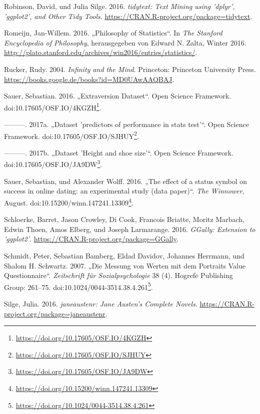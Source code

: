 \documentclass[12pt,ngerman,]{book}
\let\rmarkdownfootnote\footnote%
\def\footnote{\protect\rmarkdownfootnote}
\renewcommand{\href}[2]{#2\footnote{\url{#1}}}
\theoremstyle{definition}
\theoremstyle{definition}
\theoremstyle{remark}
\begin{document}
\hypertarget{ref-R-tidytext}{}
Robinson, David, und Julia Silge. 2016. \emph{tidytext: Text Mining
using 'dplyr', 'ggplot2', and Other Tidy Tools}.
\url{https://CRAN.R-project.org/package=tidytext}.

\hypertarget{ref-sep-statistics}{}
Romeijn, Jan-Willem. 2016. „Philosophy of Statistics``. In \emph{The
Stanford Encyclopedia of Philosophy}, herausgegeben von Edward N. Zalta,
Winter 2016.
\url{http://plato.stanford.edu/archives/win2016/entries/statistics/}.

\hypertarget{ref-ruckerinfinity}{}
Rucker, Rudy. 2004. \emph{Infinity and the Mind}. Princeton: Princeton
University Press. \url{https://books.google.de/books?id=MD0UAwAAQBAJ}.

\hypertarget{ref-Sauer_2016}{}
Sauer, Sebastian. 2016. „Extraversion Dataset``. Open Science Framework.
doi:\href{https://doi.org/10.17605/OSF.IO/4KGZH}{10.17605/OSF.IO/4KGZH}.

\hypertarget{ref-Sauer_2017}{}
---------. 2017a. „Dataset 'predictors of performance in stats test'``.
Open Science Framework.
doi:\href{https://doi.org/10.17605/OSF.IO/SJHUY}{10.17605/OSF.IO/SJHUY}.

\hypertarget{ref-Sauer_2017a}{}
---------. 2017b. „Dataset 'Height and shoe size'``. Open Science
Framework.
doi:\href{https://doi.org/10.17605/OSF.IO/JA9DW}{10.17605/OSF.IO/JA9DW}.

\hypertarget{ref-sauer_wolff}{}
Sauer, Sebastian, und Alexander Wolff. 2016. „The effect of a status
symbol on success in online dating: an experimental study (data
paper)``. \emph{The Winnower}, August.
doi:\href{https://doi.org/10.15200/winn.147241.13309}{10.15200/winn.147241.13309}.

\hypertarget{ref-R-GGally}{}
Schloerke, Barret, Jason Crowley, Di Cook, Francois Briatte, Moritz
Marbach, Edwin Thoen, Amos Elberg, und Joseph Larmarange. 2016.
\emph{GGally: Extension to 'ggplot2'}.
\url{https://CRAN.R-project.org/package=GGally}.

\hypertarget{ref-Schmidt2007}{}
Schmidt, Peter, Sebastian Bamberg, Eldad Davidov, Johannes Herrmann, und
Shalom H. Schwartz. 2007. „Die Messung von Werten mit dem Portraits
Value Questionnaire``. \emph{Zeitschrift für Sozialpsychologie} 38 (4).
Hogrefe Publishing Group: 261--75.
doi:\href{https://doi.org/10.1024/0044-3514.38.4.261}{10.1024/0044-3514.38.4.261}.

\hypertarget{ref-R-janeaustenr}{}
Silge, Julia. 2016. \emph{janeaustenr: Jane Austen's Complete Novels}.
\url{https://CRAN.R-project.org/package=janeaustenr}.
\end{document}
